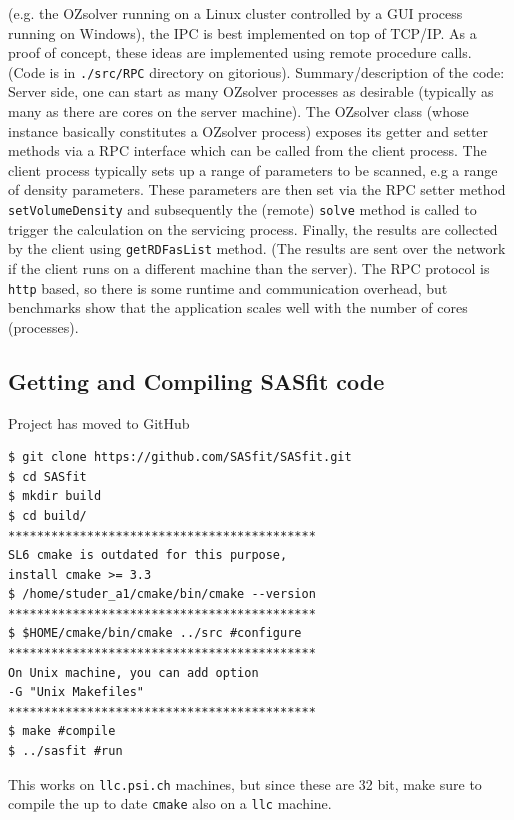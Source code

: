 \documentclass[11pt,a4paper]{article}
\begin{document}
(e.g. the OZsolver running on a Linux cluster controlled by a GUI process running on Windows), the IPC is best implemented on top of TCP/IP. 
\newpage
As a proof of concept, these ideas are implemented using remote procedure calls. (Code is in \texttt{./src/RPC} directory on gitorious).
\newline Summary/description of the code: Server side, one can start as many OZsolver processes as desirable 
(typically as many as there are cores on the server machine).
The OZsolver class (whose instance basically constitutes a OZsolver process) exposes its getter and setter methods via a RPC interface
which can be called from the client process. The client process typically sets up a range of parameters to be scanned, e.g a range of density parameters.
These parameters are then set via the RPC setter method \texttt{setVolumeDensity} and 
subsequently the (remote) \texttt{solve} method is called to trigger the calculation on the servicing process.
Finally, the results are collected by the client using \texttt{getRDFasList} method. (The results are sent over the network if the client runs on
a different machine than the server). \newline 
The RPC protocol is \texttt{http} based, so there is some runtime and communication overhead, but benchmarks show that the application
scales well with the number of cores (processes).


\subsection{Getting and Compiling SASfit code}
Project has moved to GitHub
\lstset{language=bash}
\begin{lstlisting}[frame=single]  
$ git clone https://github.com/SASfit/SASfit.git
$ cd SASfit
$ mkdir build
$ cd build/
*******************************************
SL6 cmake is outdated for this purpose, 
install cmake >= 3.3
$ /home/studer_a1/cmake/bin/cmake --version
*******************************************
$ $HOME/cmake/bin/cmake ../src #configure
*******************************************
On Unix machine, you can add option
-G "Unix Makefiles"
*******************************************
$ make #compile
$ ../sasfit #run
\end{lstlisting}
This works on \texttt{llc.psi.ch} machines, but since these are 32 bit, make sure to compile the up to date \texttt{cmake} also on a \texttt{llc} machine.
\newpage
\end{document}
